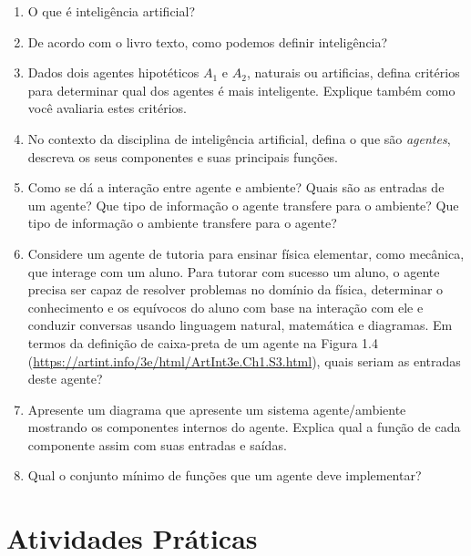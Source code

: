 \documentclass{article}
\begin{document}
\begin{enumerate}
\item O que é inteligência artificial?

\item De acordo com o livro texto, como podemos definir inteligência?

\item Dados dois agentes hipotéticos $A_1$ e $A_2$, naturais ou artificias, defina critérios para determinar qual dos agentes é mais inteligente. Explique também como você avaliaria estes critérios.

\item No contexto da disciplina de inteligência artificial, defina o que são \textit{agentes}, descreva os seus componentes e suas principais funções.

\item Como se dá a interação entre agente e ambiente? Quais são as entradas de um agente? Que tipo de informação o agente transfere para o ambiente? Que tipo de informação o ambiente transfere para o agente?

\item Considere um agente de tutoria para ensinar física elementar, como mecânica, que interage com um aluno. Para tutorar com sucesso um aluno, o agente precisa ser capaz de resolver problemas no domínio da física, determinar o conhecimento e os equívocos do aluno com base na interação com ele e conduzir conversas usando linguagem natural, matemática e diagramas. Em termos da definição de caixa-preta de um agente na Figura 1.4 (\url{https://artint.info/3e/html/ArtInt3e.Ch1.S3.html}), quais seriam as entradas deste agente?

\item Apresente um diagrama que apresente um sistema agente/ambiente mostrando os componentes internos do agente. Explica qual a função de cada componente assim com suas entradas e saídas.

\item Qual o conjunto mínimo de funções que um agente deve implementar?


\end{enumerate}


\section{Atividades Práticas}
\end{document}
